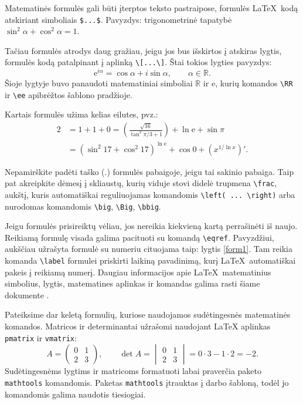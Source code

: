 \documentclass[]{VUMIFTemplateClass}
\newcommand{\ee}{{\mathrm e}}  %
\newcommand{\RR}{\mathbb{R}}
\begin{document}
Matematinės formulės gali būti įterptos teksto pastraipose, formulės \LaTeX~kodą atskiriant simboliais \texttt{\$...\$}. Pavyzdys: trigonometrinė tapatybė $\sin^2 \alpha + \cos^2 \alpha = 1$.

Tačiau formulės atrodys daug gražiau, jeigu jos bus išskirtos į atskiras lygtis, formulės kodą patalpinant į aplinką \texttt{\textbackslash[...\textbackslash]}. Štai tokios lygties pavyzdys:
\[
\ee^{i \alpha} = \cos{\alpha} + i \sin{\alpha}, \qquad \alpha \in \RR.
\]
Šioje lygtyje buvo panaudoti matematiniai simboliai $\RR$ ir $\ee$, kurių komandos \texttt{\textbackslash RR} ir \texttt{\textbackslash ee} apibrėžtos šablono pradžioje.

Kartais formulės užima kelias eilutes, pvz.:
\begin{equation}
\begin{split}
2&= 1+1+0=\left(\frac{\sqrt{16}}{\tan^2\pi/3+1}\right) +\ln\ee+\sin\pi\\
&= (\sin^2 17+\cos^2 17)^{\ln\ee}+\cos 0 +(x^{1/\ln x})'. 
\label{form1}
\end{split}
\end{equation}

Nepamirškite padėti taško ($.$) formulės pabaigoje, jeigu tai sakinio pabaiga. Taip pat akreipkite dėmesį į skliaustų, kurių viduje stovi didelė trupmena \texttt{\textbackslash frac}, aukštį, kuris automatiškai reguliuojamas komandomis \texttt{\textbackslash left( ... \textbackslash right)} arba nurodomas komandomis \texttt{\textbackslash big}, \texttt{\textbackslash Big}, \texttt{\textbackslash bbig}.

\bigskip

Jeigu formulės prisireiktų vėliau, jos nereikia kiekvieną kartą perrašinėti iš naujo. Reikiamą formulę visada galima pacituoti su komandą \texttt{\textbackslash eqref}. Pavyzdžiui, aukščiau užrašyta formulė su numeriu cituojama taip: lygtis \eqref{form1}. Tam reikia komanda \texttt{\textbackslash  label} formulei priskirti laikiną pavadinimą, kurį \LaTeX~automatiškai pakeis į reikiamą numerį. Daugiau informacijos apie \LaTeX~matematinius simbolius, lygtis, matematines aplinkas ir komandas galima rasti šiame dokumente \cite{amsdoc}.

\bigskip

Pateiksime dar keletą formulių, kuriose naudojamos sudėtingesnės matematinės komandos. Matricos ir determinantai užrašomi naudojant LaTeX aplinkas \texttt{pmatrix} ir \texttt{vmatrix}:
\[
A= \begin{pmatrix}
    0 & 1\\
    2 & 3
\end{pmatrix}, \qquad
\det A =
\begin{vmatrix}
0 & 1\\
2 & 3    
\end{vmatrix} = 0 \cdot 3 - 1 \cdot 2 = -2.
\]
Sudėtingesnėms lygtims ir matricoms formatuoti labai praverčia paketo \texttt{mathtools} \cite{mtoolsdoc} komandomis. Paketas \texttt{mathtools} įtrauktas į darbo šabloną, todėl jo komandomis galima naudotis tiesiogiai.
\end{document}
